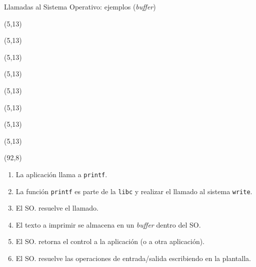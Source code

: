 \documentclass[aspectratio=169]{beamer}
\begin{document}
\begin{frame}[fragile]{Llamadas al Sistema Operativo: ejemplos (\emph{buffer})}
    \begin{textblock}{60}(5,13)  \end{textblock}
    \begin{textblock}{60}(5,13)  \end{textblock}
    \begin{textblock}{60}(5,13)  \end{textblock}
    \begin{textblock}{60}(5,13)  \end{textblock}
    \begin{textblock}{60}(5,13)  \end{textblock}
    \begin{textblock}{60}(5,13)  \end{textblock}
    \begin{textblock}{60}(5,13)  \end{textblock}
    \begin{textblock}{60}(5,13)  \end{textblock}
    \begin{textblock}{60}(92,8)
    \begin{enumerate}
    \setlength\itemsep{0.4cm}
     \item<2-> La aplicación llama a \texttt{printf}.
     \item<3-> La función \texttt{printf} es parte de la \texttt{libc} y realizar el llamado al sistema \texttt{write}.
     \item<4-> El SO. resuelve el llamado. 
     \item<5-> El texto a imprimir se almacena en un \emph{buffer} dentro del SO.
     \item<6-> El SO. retorna el control a la aplicación (o a otra aplicación).
     \item<7-> El SO. resuelve las operaciones de entrada/salida escribiendo en la plantalla. 
    \end{enumerate}
    \end{textblock}
\end{frame}
\end{document}

